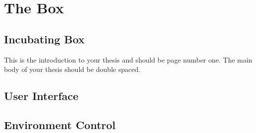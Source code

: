 \chapter{The Box}

\section{Incubating Box}

This is the introduction to your thesis and should be page number one.
The main body of your thesis should be double spaced.

\section{User Interface}


\section{Environment Control}
